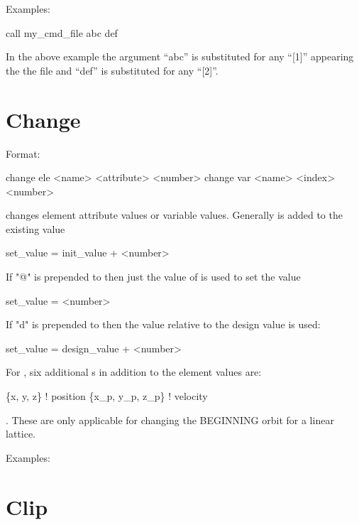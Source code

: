 Examples:
\begin{example}
    call my_cmd_file abc def 
\end{example}
In the above example the argument ``abc'' is substituted for any
``[1]'' appearing the the file and ``def'' is substituted for any
``[2]''.

\section{Change}
\label{s:change}

Format:
\begin{example}
  change ele <name> <attribute> <number>
  change var <name> <index> <number>
\end{example}

\vskip 0.2in
 changes element attribute values or variable values. Generally
 is added to the existing value
\begin{example}
  set_value = init_value + <number>
\end{example}
If "@" is prepended to  then just the value of
 is used to set the value
\begin{example}
  set_value = <number>
\end{example}
If "d" is prepended to   then the value relative to the design
value is used:
\begin{example}
  set_value = design_value + <number>
\end{example}

For , six additional
s in addition to the element values are:
\begin{example}
  \{x, y, z\}           ! position 
  \{x\_p, y\_p, z\_p\}  ! velocity
\end{example}.
These are only applicable for changing the BEGINNING orbit for a
linear lattice.

Examples:


\section{Clip}
\label{s:clip}

